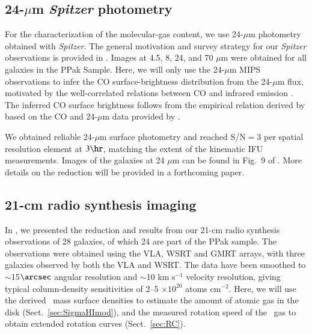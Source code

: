 \documentclass[traditabstract]{aa} %
\begin{document}
 
\subsection{24-$\mu$m {\it Spitzer} photometry}
\label{sec:Spitzer}
For the characterization of the molecular-gas content, we use 24-$\mu$m photometry
obtained with {\it Spitzer}. The general motivation and survey strategy for our 
{\it Spitzer} observations is provided in . Images at 4.5, 8,
24, and 70 $\mu$m were obtained for all galaxies in the PPak Sample. Here, we will only 
use the 24-$\mu$m MIPS observations to infer the CO surface-brightness distribution from 
the  24-$\mu$m flux, motivated by the well-correlated relations between CO and infrared
emission \citep[e.g.,][]{young1991, paladino2006, regan2006, bendo2010}.
The inferred CO surface brightness follows from the empirical relation derived by
\citet[][hereafter ]{westfall2011b} based on the CO and 
24-$\mu$m data provided by \cite{leroy2008}.

We obtained reliable 24-$\mu$m surface photometry and reached S/N$=$3 per spatial
resolution element at $3\hr$, matching the extent of the kinematic IFU measurements.
Images of the galaxies at 24 $\mu$m can be found in Fig.~9 of
. More details on the reduction will be provided in a
forthcoming paper.


\subsection{21-cm radio synthesis imaging}
\label{sec:HIdata}
In \cite{martinsson2011}, we presented the reduction and results from our 21-cm radio 
synthesis observations of 28 galaxies, of which 24 are part of the PPak sample. 
The observations were obtained using the VLA, WSRT and GMRT arrays, with three galaxies
observed by both the VLA and WSRT. The data have been smoothed to $\sim$15$\arcsec$
angular resolution and $\sim$10 km s$^{-1}$ velocity resolution, giving typical 
column-density sensitivities of 2--5 $\times 10^{20}$ atoms cm$^{-2}$.
Here, we will use the derived \hone\ mass surface densities to estimate the amount of
atomic gas in the disk (Sect.~\ref{sec:SigmaHImod}), and the measured rotation speed of
the \hone\ gas to obtain extended rotation curves (Sect.~\ref{sec:RC}).


\end{document}
